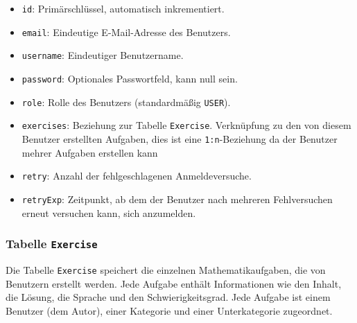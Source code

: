 \documentclass[12pt,a4paper]{scrartcl} %
\begin{document}
\begin{itemize}
  \item \texttt{id}: Primärschlüssel, automatisch inkrementiert.
  \item \texttt{email}: Eindeutige E-Mail-Adresse des Benutzers.
  \item \texttt{username}: Eindeutiger Benutzername.
  \item \texttt{password}: Optionales Passwortfeld, kann null sein.
  \item \texttt{role}: Rolle des Benutzers (standardmäßig \texttt{USER}).
  \item \texttt{exercises}: Beziehung zur Tabelle \texttt{Exercise}. Verknüpfung zu den von diesem Benutzer erstellten Aufgaben, dies ist eine \texttt{1:n}-Beziehung da der Benutzer mehrer Aufgaben erstellen kann
  \item \texttt{retry}: Anzahl der fehlgeschlagenen Anmeldeversuche.
  \item \texttt{retryExp}: Zeitpunkt, ab dem der Benutzer nach mehreren Fehlversuchen erneut versuchen kann, sich anzumelden.
\end{itemize}

\subsubsection{Tabelle \texttt{Exercise}}

Die Tabelle \texttt{Exercise} speichert die einzelnen Mathematikaufgaben, die von Benutzern erstellt werden. Jede Aufgabe enthält Informationen wie den Inhalt, die Lösung, die Sprache und den Schwierigkeitsgrad. Jede Aufgabe ist einem Benutzer (dem Autor), einer Kategorie und einer Unterkategorie zugeordnet.
\end{document}

